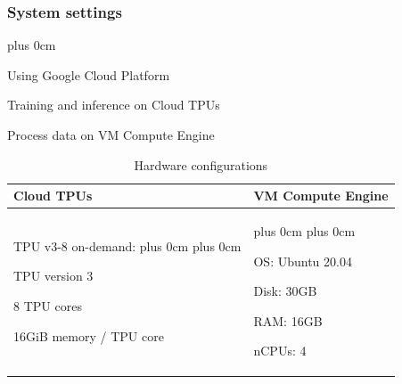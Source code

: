 \documentclass[11pt]{beamer}
\renewcommand{\raggedright}{\leftskip=0pt \rightskip=0pt plus 0cm}
\let\olditemize=\itemize
\renewenvironment{itemize}{\olditemize\raggedright}{\endlist}
\begin{document}
\begin{frame}
\frametitle{System settings}
\begin{adjustwidth}{-2em}{0em}
\begin{itemize}
	\item Using Google Cloud Platform
	\item Training and inference on Cloud TPUs
	\item Process data on VM Compute Engine
\end{itemize}
\vspace{1cm}
\begin{table}[!htbp]
\centering
\caption{Hardware configurations}
\begin{tabular}{p{.45\linewidth}p{.45\linewidth}}
	\toprule
	Cloud TPUs & VM Compute Engine \\
	\midrule
	\begin{minipage}{6cm}
		TPU v3-8 on-demand:
		\begin{itemize}
			\item TPU version 3
			\item 8 TPU cores
			\item 16GiB memory / TPU core
		\end{itemize}
	\end{minipage} & \begin{minipage}{6cm}
		\begin{itemize}\item OS: Ubuntu 20.04  \item Disk: 30GB \item RAM: 16GB \item nCPUs: 4\end{itemize}
	\end{minipage} \\
	\bottomrule
\end{tabular}
\end{table}
\end{adjustwidth}
\end{frame}
\end{document}
